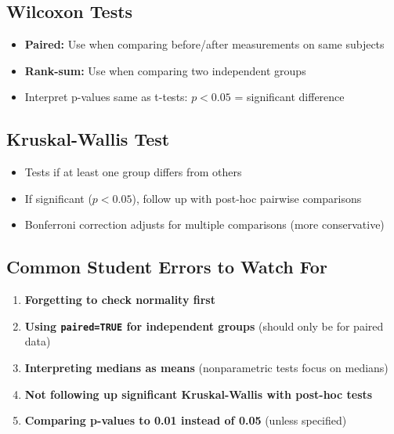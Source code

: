 \documentclass[11pt]{article}
\begin{document}
\subsection{Wilcoxon Tests}
\begin{itemize}
\item \textbf{Paired:} Use when comparing before/after measurements on same subjects
\item \textbf{Rank-sum:} Use when comparing two independent groups
\item Interpret p-values same as t-tests: $p < 0.05$ = significant difference
\end{itemize}

\subsection{Kruskal-Wallis Test}
\begin{itemize}
\item Tests if at least one group differs from others
\item If significant ($p < 0.05$), follow up with post-hoc pairwise comparisons
\item Bonferroni correction adjusts for multiple comparisons (more conservative)
\end{itemize}

\subsection{Common Student Errors to Watch For}
\begin{enumerate}
\item \textbf{Forgetting to check normality first}
\item \textbf{Using \texttt{paired=TRUE} for independent groups} (should only be for paired data)
\item \textbf{Interpreting medians as means} (nonparametric tests focus on medians)
\item \textbf{Not following up significant Kruskal-Wallis with post-hoc tests}
\item \textbf{Comparing p-values to 0.01 instead of 0.05} (unless specified)
\end{enumerate}
\end{document}
